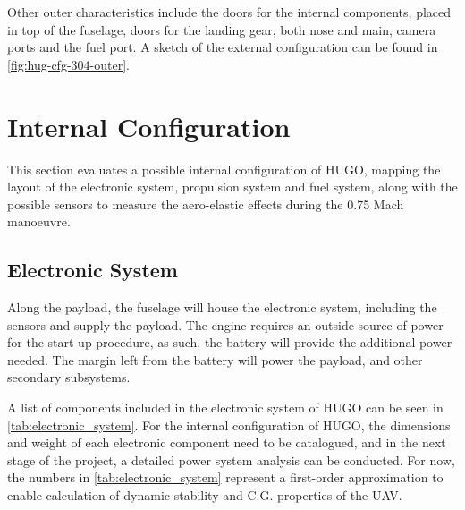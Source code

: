Other outer characteristics include the doors for the internal components, placed in top of the fuselage, doors for the landing gear, both nose and main, camera ports and the fuel port. A sketch of the external configuration can be found in \autoref{fig:hug-cfg-304-outer}.






\section{Internal Configuration}
\label{sec:internal_configuration}
This section evaluates a possible internal configuration of HUGO, mapping the layout of the electronic system, propulsion system and fuel system, along with the possible sensors to measure the aero-elastic effects during the 0.75 Mach manoeuvre.
\subsection{Electronic System}
\label{subsec:on-board_electronic_units}
Along the payload, the fuselage will house the electronic system, including the sensors and supply the payload. The engine requires an outside source of power for the start-up procedure, as such, the battery will provide the additional power needed. The margin left from the battery will power the payload, and other secondary subsystems.

A list of components included in the electronic system of HUGO can be seen in \autoref{tab:electronic_system}. For the internal configuration of HUGO, the dimensions and weight of each electronic component need to be catalogued, and in the next stage of the project, a detailed power system analysis can be conducted. For now, the numbers in \autoref{tab:electronic_system} represent a first-order approximation to enable calculation of dynamic stability and C.G. properties of the UAV.

